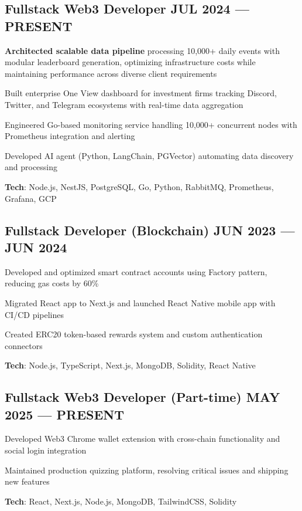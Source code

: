 \documentclass[letter,10pt]{article}
\begin{document}
\subsection{{Fullstack Web3 Developer \hfill JUL 2024 --- PRESENT}}
\begin{zitemize}
  \item \textbf{Architected scalable data pipeline} processing 10,000+ daily events with modular leaderboard generation, optimizing infrastructure costs while maintaining performance across diverse client requirements
  \item Built enterprise One View dashboard for investment firms tracking Discord, Twitter, and Telegram ecosystems with real-time data aggregation
  \item Engineered Go-based monitoring service handling 10,000+ concurrent nodes with Prometheus integration and alerting
  \item Developed AI agent (Python, LangChain, PGVector) automating data discovery and processing
  \item \textbf{Tech}: Node.js, NestJS, PostgreSQL, Go, Python, RabbitMQ, Prometheus, Grafana, GCP
\end{zitemize}


\subsection{{Fullstack Developer (Blockchain) \hfill JUN 2023 --- JUN 2024}}
\begin{zitemize}
  \item Developed and optimized smart contract accounts using Factory pattern, reducing gas costs by 60\%
  \item Migrated React app to Next.js and launched React Native mobile app with CI/CD pipelines
  \item Created ERC20 token-based rewards system and custom authentication connectors
  \item \textbf{Tech}: Node.js, TypeScript, Next.js, MongoDB, Solidity, React Native
\end{zitemize}


\subsection{{Fullstack Web3 Developer (Part-time) \hfill MAY 2025 --- PRESENT}}
\begin{zitemize}
  \item Developed Web3 Chrome wallet extension with cross-chain functionality and social login integration
  \item Maintained production quizzing platform, resolving critical issues and shipping new features
  \item \textbf{Tech}: React, Next.js, Node.js, MongoDB, TailwindCSS, Solidity
\end{zitemize}
\end{document}

